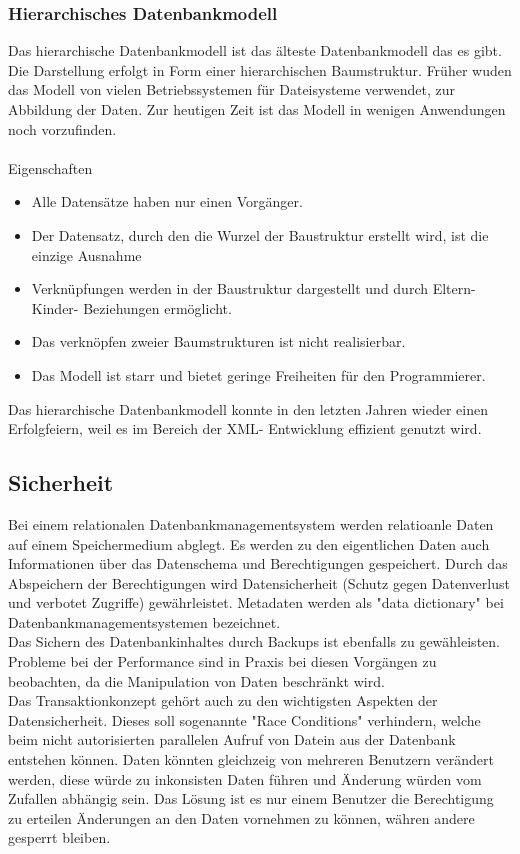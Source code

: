 \documentclass[12pt,a4paper]{report}
\begin{document}
\begin{onehalfspace}
\subsubsection{Hierarchisches Datenbankmodell}
Das hierarchische Datenbankmodell ist das älteste Datenbankmodell das es gibt. Die Darstellung erfolgt in Form einer hierarchischen Baumstruktur. Früher wuden das Modell von vielen Betriebssystemen für Dateisysteme verwendet, zur Abbildung der Daten. Zur heutigen Zeit ist das Modell in wenigen Anwendungen noch vorzufinden.\\
\\Eigenschaften
\begin{itemize}
\item Alle Datensätze haben nur einen Vorgänger.
\item Der Datensatz, durch den die Wurzel der Baustruktur erstellt wird, ist die einzige Ausnahme
\item Verknüpfungen werden in der Baustruktur dargestellt und durch Eltern- Kinder- Beziehungen ermöglicht.
\item Das verknöpfen zweier Baumstrukturen ist nicht realisierbar.
\item Das Modell ist starr und bietet geringe Freiheiten für den Programmierer.
\end{itemize}
Das hierarchische Datenbankmodell konnte in den letzten Jahren wieder einen Erfolgfeiern, weil es im Bereich der XML- Entwicklung effizient genutzt wird.

\subsection{Sicherheit}
Bei einem relationalen Datenbankmanagementsystem werden relatioanle Daten auf einem Speichermedium abglegt. Es werden zu den eigentlichen Daten auch Informationen über das Datenschema und Berechtigungen gespeichert. Durch das Abspeichern der Berechtigungen wird Datensicherheit (Schutz gegen Datenverlust und verbotet Zugriffe) gewährleistet. Metadaten werden als "{}data dictionary"{} bei Datenbankmanagementsystemen bezeichnet.\\

Das Sichern des Datenbankinhaltes durch Backups ist ebenfalls zu gewähleisten. Probleme bei der Performance sind in Praxis bei diesen Vorgängen zu beobachten, da die Manipulation von Daten beschränkt wird. \\

Das Transaktionkonzept gehört auch zu den wichtigsten Aspekten der Datensicherheit. Dieses soll sogenannte "{}Race Conditions"{} verhindern, welche beim nicht autorisierten parallelen Aufruf von Datein aus der Datenbank entstehen können. Daten könnten gleichzeig von mehreren Benutzern verändert werden, diese würde zu inkonsisten Daten führen und Änderung würden vom Zufallen abhängig sein. Das Lösung ist es nur einem Benutzer die Berechtigung zu erteilen Änderungen an den Daten vornehmen zu können, währen andere gesperrt bleiben.\\


\end{onehalfspace}
\end{document}
